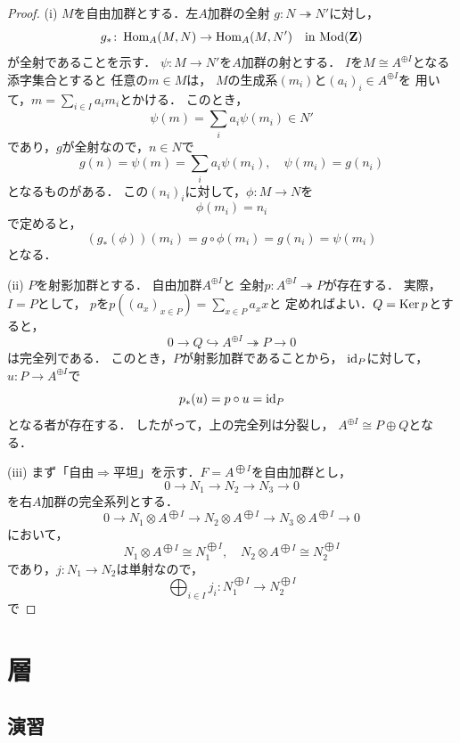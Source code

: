 \begin{proof}
    (i) 
    \(M\)を自由加群とする．左\(A\)加群の全射
    \(g\colon N\twoheadrightarrow N'\)に対し，\[
        g_\ast\colon\mathop{\mathrm{Hom}}\nolimits_A(M,N)\to\mathop{\mathrm{Hom}}\nolimits_A(M,N') 
        \quad\text{in \(\mathop{\mathrm{Mod}}\nolimits(\mathbf{Z})\)}
    \]が全射であることを示す．
    \(\psi\colon M\to N'\)を\(A\)加群の射とする．
    \(I\)を\(M\cong A^{\oplus I}\)となる添字集合とすると
    任意の\(m\in M\)は，
    \(M\)の生成系\((m_i)\)と\((a_i)_i\in A^{\oplus I}\)を
    用いて，\(m=\sum_{i\in I}a_im_i\)とかける．
    このとき，\[
        \psi(m)=\sum_{i}a_i\psi(m_i)\in N'
    \]であり，\(g\)が全射なので，\(n\in N\)で\[
        g(n)=\psi(m)=\sum_{i}a_i\psi(m_i),
        \quad
        \psi(m_i)=g(n_i)
    \]となるものがある．
    この\((n_i)_i\)に対して，\(\phi\colon M\to N\)を
    \[
        \phi(m_i)=n_i
    \]で定めると，
    \[
        \left(g_\ast(\phi)\right)(m_i)=g\circ\phi(m_i)=g(n_i)=\psi(m_i)
    \]となる．
    
    (ii) 
    \(P\)を射影加群とする．
    自由加群\(A^{\oplus I}\)と
    全射\(p\colon A^{\oplus I}\twoheadrightarrow P\)が存在する．
    実際，\(I= P\)として，
    \(p\)を\(p((a_x)_{x\in P})=\sum_{x\in P}a_xx\)と
    定めればよい．\(Q=\mathop{\mathrm{Ker}}\nolimits p\)とすると，\[
        0\to Q\hookrightarrow A^{\oplus I}\twoheadrightarrow P\to0
    \]は完全列である．
    このとき，\(P\)が射影加群であることから，
    \(\mathop{\mathrm{id}}\nolimits_P\)に対して，\(u\colon P\to A^{\oplus I}\)で
    \[p_\ast(u)=p\circ u=\mathop{\mathrm{id}}\nolimits_P\]となる者が存在する．
    したがって，上の完全列は分裂し，
    \(A^{\oplus I}\cong P\oplus Q\)となる．
    
    (iii) 
    まず「自由\(\Rightarrow\)平坦」を示す．\(F=A^{\bigoplus I}\)を自由加群とし，\[
        0\to N_1\to N_2\to N_3\to0
    \]を右\(A\)加群の完全系列とする．\[
        0\to N_1\otimes A^{\bigoplus I}\to N_2\otimes A^{\bigoplus I}\to N_3\otimes A^{\bigoplus I}\to0
    \]において，\[
        N_1\otimes A^{\bigoplus I}\cong N_1^{\bigoplus I},\quad
        N_2\otimes A^{\bigoplus I}\cong N_2^{\bigoplus I}
    \]であり，\(j\colon N_1\to N_2\)は単射なので，\[
        \bigoplus_{i\in I}j_i\colon N_1^{\bigoplus I}\to N_2^{\bigoplus I}
    \]で
\end{proof}


\chapter{層}\label{chap2}
\section*{演習}
